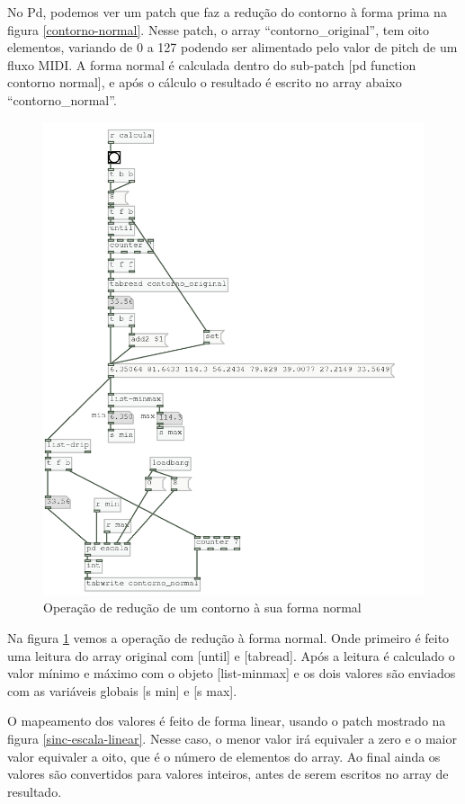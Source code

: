 \documentclass[draft]{ppgmus}
\begin{document}
No Pd, podemos ver um patch que faz a redução do contorno à forma prima 
na figura \ref{contorno-normal}. Nesse patch, o array ``contorno\_original'',
tem oito elementos, variando de 0 a 127 podendo ser alimentado pelo valor de pitch de um fluxo
MIDI. A forma normal é calculada dentro do sub-patch [pd function contorno normal], e após
o cálculo o resultado é escrito no array abaixo ``contorno\_normal''.

\begin{figure}
\includegraphics[scale=.6]{func-contorno-normal}
\caption{Operação de redução de um contorno à sua forma normal}
\label{func-contorno-normal}
\end{figure}

Na figura \ref{func-contorno-normal} vemos a operação de redução à forma normal.
Onde primeiro é feito uma leitura do array original com [until] e [tabread]. Após
a leitura é calculado o valor mínimo e máximo com o objeto [list-minmax] e os dois
valores são enviados com as variáveis globais [s min] e [s max].

O mapeamento dos valores é feito de forma linear, usando o patch mostrado na figura \ref{sinc-escala-linear}.
Nesse caso, o menor valor irá equivaler a zero e o maior valor equivaler a oito, que é o
número de elementos do array. Ao final ainda os valores são convertidos para valores inteiros,
antes de serem escritos no array de resultado.
\end{document}
